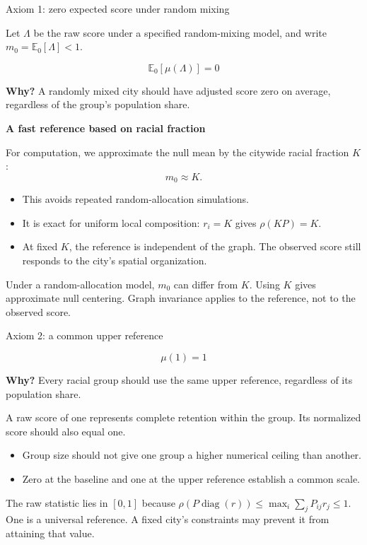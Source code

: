 \documentclass[aspectratio=169,10pt]{beamer}
\begin{document}
\begin{frame}[shrink=0]{Axiom 1: zero expected score under random mixing}
\small

Let $\Lambda$ be the raw score under a specified random-mixing
model, and write $m_0=\mathbb{E}_0[\Lambda]<1$.

\[
    \boxed{\mathbb{E}_0[\mu(\Lambda)]=0}
\]

\textbf{Why?}
A randomly mixed city should have adjusted score zero
on average, regardless of the group's population share.

\medskip
\textbf{A fast reference based on racial fraction}

For computation, we approximate the null mean by the citywide
racial fraction $K$:
\[
    m_0\approx K.
\]

\begin{itemize}
    \item This avoids repeated random-allocation simulations.
    \item It is exact for uniform local composition:
          $r_i=K$ gives $\rho(KP)=K$.
    \item At fixed $K$, the reference is independent of the graph.
          The observed score still responds to the city's
          spatial organization.
\end{itemize}

\medskip
{\footnotesize
Under a random-allocation model, $m_0$ can differ from $K$.
Using $K$ gives approximate null centering.
Graph invariance applies to the reference, not to the observed score.
}

\end{frame}

\begin{frame}[shrink=0]{Axiom 2: a common upper reference}

\[
    \boxed{\mu(1)=1}
\]

\textbf{Why?}
Every racial group should use the same upper reference,
regardless of its population share.

\medskip
A raw score of one represents complete retention within
the group. Its normalized score should also equal one.

\medskip
\begin{itemize}
    \item Group size should not give one group a higher
          numerical ceiling than another.
    \item Zero at the baseline and one at the upper reference
          establish a common scale.
\end{itemize}

\medskip
{\footnotesize
The raw statistic lies in $[0,1]$ because
$\rho(P\operatorname{diag}(r))\leq
\max_i\sum_jP_{ij}r_j\leq1$.
One is a universal reference.
A fixed city's constraints may prevent it from attaining that value.
}

\end{frame}
\end{document}
